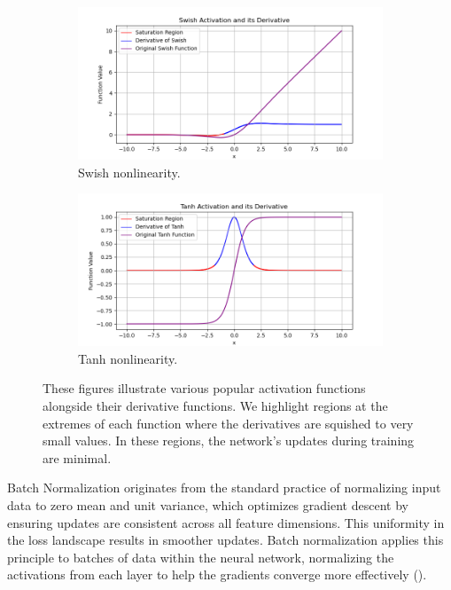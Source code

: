 \begin{figure}[htbp]
          \begin{subfigure}{0.49\textwidth}
            \includegraphics[width=\linewidth]{images/methods_mono/batch_norm/swish.png}
            \caption{Swish nonlinearity.}
            \label{fig:image3}
          \end{subfigure}
          \hfill
          \begin{subfigure}{0.49\textwidth}
            \includegraphics[width=\linewidth]{images/methods_mono/batch_norm/tanh.png}
            \caption{Tanh nonlinearity.}
            \label{fig:image4}
          \end{subfigure}
            \captionsetup{justification=justified, singlelinecheck=false, width=1\linewidth, labelfont=bf} 
          \caption{These figures illustrate various popular activation functions alongside their derivative functions. We highlight regions at the extremes of each function where the derivatives are squished to very small values. In these regions, the network's updates during training are minimal.}
          \label{fig:2x2grid}
        \end{figure}
        
        \bigskip
        
        \noindent Batch Normalization originates from the standard practice of normalizing input data to zero mean and unit variance, which optimizes gradient descent by ensuring updates are consistent across all feature dimensions. This uniformity in the loss landscape results in smoother updates. Batch normalization applies this principle to batches of data within the neural network, normalizing the activations from each layer to help the gradients converge more effectively (\cite{ioffe2015batch}).
        
